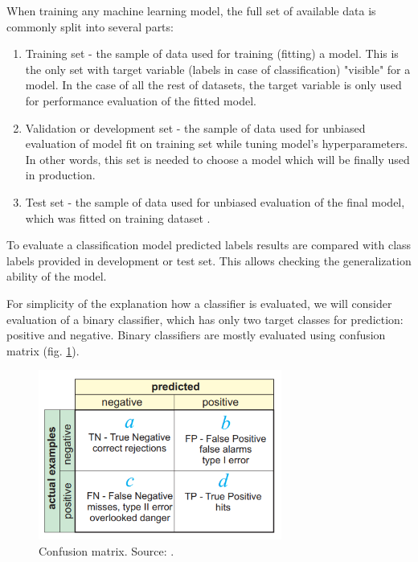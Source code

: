 When training any machine learning model, the full set of available data is commonly split into several parts:
\begin{enumerate}
    \item Training set - the sample of data used for training (fitting) a model. This is the only set with target variable (labels in case of classification) "visible" for a model. In the case of all the rest of datasets, the target variable is only used for performance evaluation of the fitted model. 
    \item Validation or development set - the sample of data used for unbiased evaluation of model fit on training set while tuning model's hyperparameters. In other words, this set is needed to choose a model which will be finally used in production.
    \item Test set - the sample of data used for unbiased evaluation of the final model, which was fitted on training dataset \citep{Kuhn-2013}.
\end{enumerate}

To evaluate a classification model predicted labels results are compared with class labels provided in development or test set. This allows checking the generalization ability of the model.

For simplicity of the explanation how a classifier is evaluated, we will consider evaluation of a binary classifier, which has only two target classes for prediction: positive and negative. 
Binary classifiers are mostly evaluated using confusion matrix (fig. \ref{fig:confusion-matrix}).

\begin{figure}[h]
    \centering
    \includegraphics[width=8cm]{Images/Confusion-matrix.png}
    \caption{Confusion matrix. Source: \citep{kohavi:glossary}.}
    \label{fig:confusion-matrix}
\end{figure}

